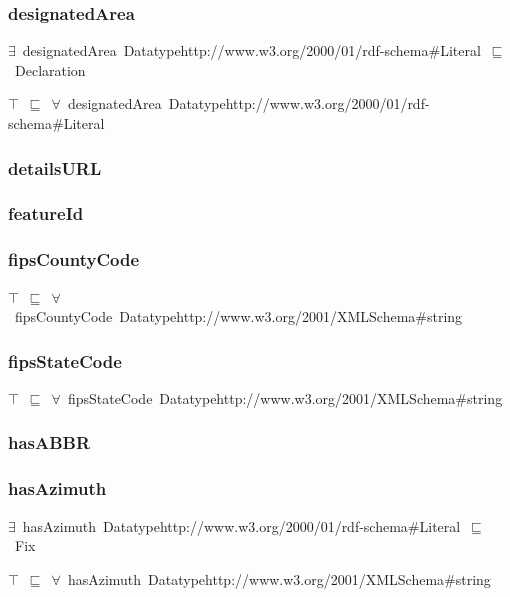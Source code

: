 \documentclass{article}
\begin{document}
\subsubsection*{designatedArea}

\ensuremath{\exists}~designatedArea~Datatypehttp://www.w3.org/2000/01/rdf-schema#Literal~\ensuremath{\sqsubseteq}~Declaration

\ensuremath{\top}~\ensuremath{\sqsubseteq}~\ensuremath{\forall}~designatedArea~Datatypehttp://www.w3.org/2000/01/rdf-schema#Literal

\subsubsection*{detailsURL}

\subsubsection*{featureId}

\subsubsection*{fipsCountyCode}

\ensuremath{\top}~\ensuremath{\sqsubseteq}~\ensuremath{\forall}~fipsCountyCode~Datatypehttp://www.w3.org/2001/XMLSchema#string

\subsubsection*{fipsStateCode}

\ensuremath{\top}~\ensuremath{\sqsubseteq}~\ensuremath{\forall}~fipsStateCode~Datatypehttp://www.w3.org/2001/XMLSchema#string

\subsubsection*{hasABBR}

\subsubsection*{hasAzimuth}

\ensuremath{\exists}~hasAzimuth~Datatypehttp://www.w3.org/2000/01/rdf-schema#Literal~\ensuremath{\sqsubseteq}~Fix

\ensuremath{\top}~\ensuremath{\sqsubseteq}~\ensuremath{\forall}~hasAzimuth~Datatypehttp://www.w3.org/2001/XMLSchema#string
\end{document}
